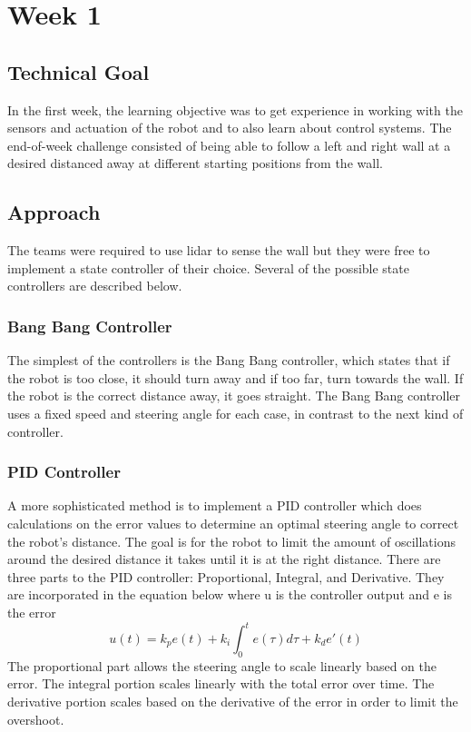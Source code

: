 \documentclass[journal, a4paper]{IEEEtran}
\begin{document}
\section{Week 1}
\subsection{Technical Goal}
In the first week, the learning objective was to get experience in working with the sensors and actuation of the robot and to also learn about control systems. The end-of-week challenge consisted of being able to follow a left and right wall at a desired distanced away at different starting positions from the wall. 
\subsection{Approach}
The teams were required to use lidar to sense the wall but they were free to implement a state controller of their choice. Several of the possible state controllers are described below. 
\subsubsection{Bang Bang Controller}The simplest of the controllers is the Bang Bang controller, which states that if the robot is too close, it should turn away and if too far, turn towards the wall. If the robot is the correct distance away, it goes straight. The Bang Bang controller uses a fixed speed and steering angle for each case, in contrast to the next kind of controller. 
\subsubsection{PID Controller}A more sophisticated method is to implement a PID controller which does calculations on the error values to determine an optimal steering angle to correct the robot's distance. The goal is for the robot to limit the amount of oscillations around the desired distance it takes until it is at the right distance. There are three parts to the PID controller: Proportional, Integral, and Derivative. They are incorporated in the equation below where u is the controller output and e is the error
\begin{equation}
u(t) = k_{p}e(t)+k_i\int_{0}^{t}e(\tau)d\tau + k_{d}e'(t)
\end{equation}
The proportional part allows the steering angle to scale linearly based on the error. The integral portion scales linearly with the total error over time. The derivative portion scales based on the derivative of the error in order to limit the overshoot. \cite{pid-mit}
\end{document}
